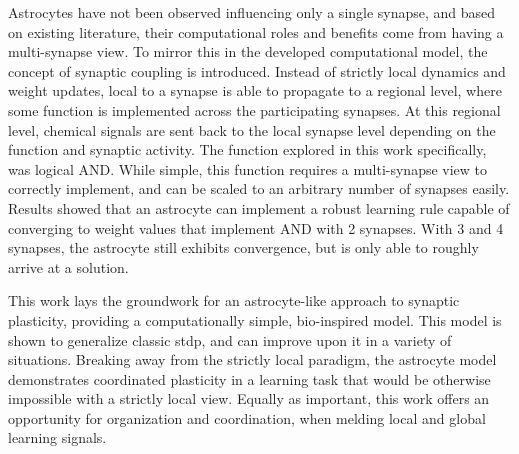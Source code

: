 Astrocytes have not been observed influencing only a single synapse, and based
on existing literature, their computational roles and benefits come from having
a multi-synapse view. To mirror this in the developed computational model, the
concept of synaptic coupling is introduced. Instead of strictly local dynamics
and weight updates, \ca local to a synapse is able to propagate to a regional
level, where some function is implemented across the participating synapses. At
this regional level, chemical signals are sent back to the local synapse level
depending on the function and synaptic activity. The function explored in this
work specifically, was logical AND. While simple, this function requires a
multi-synapse view to correctly implement, and can be scaled to an arbitrary
number of synapses easily. Results showed that an astrocyte can implement a
robust learning rule capable of converging to weight values that implement AND
with 2 synapses. With 3 and 4 synapses, the astrocyte still exhibits
convergence, but is only able to roughly arrive at a solution.

This work lays the groundwork for an astrocyte-like approach to synaptic
plasticity, providing a computationally simple, bio-inspired model. This model
is shown to generalize classic \gls{stdp}, and can improve upon it in a variety
of situations. Breaking away from the strictly local paradigm, the astrocyte
model demonstrates coordinated plasticity in a learning task that would be
otherwise impossible with a strictly local view. Equally as important, this work
offers an opportunity for organization and coordination, when melding local and
global learning signals.
